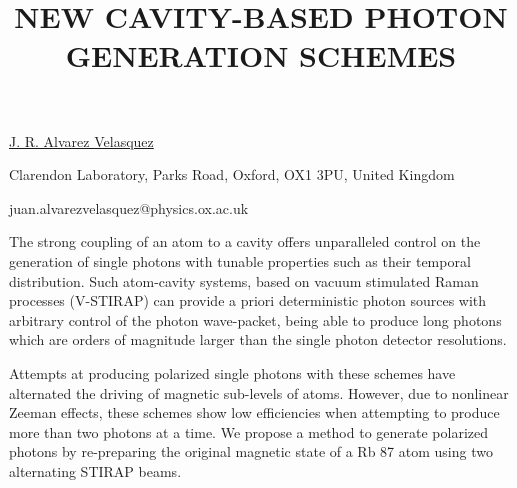 \title{NEW CAVITY-BASED PHOTON GENERATION SCHEMES}

\underline{J. R. Alvarez Velasquez}  

{\normalsize{\vspace{-4mm}
Clarendon Laboratory, Parks Road, Oxford, OX1 3PU, United Kingdom



\email juan.alvarezvelasquez@physics.ox.ac.uk}}

The strong coupling of an atom to a cavity offers unparalleled control on the generation of single photons with tunable properties such as their temporal distribution. Such atom-cavity systems, based on vacuum stimulated Raman processes (V-STIRAP) can provide a priori deterministic photon sources with arbitrary control of the photon wave-packet, being able to produce long photons which are orders of magnitude larger than the single photon detector resolutions.

Attempts at producing polarized single photons with these schemes have alternated the driving of magnetic sub-levels of atoms. However, due to nonlinear Zeeman effects, these schemes show low efficiencies when attempting to produce more than two photons at a time. We propose a method to generate polarized photons by re-preparing the original magnetic state of a Rb 87 atom using two alternating STIRAP beams.

\vspace{\baselineskip}
